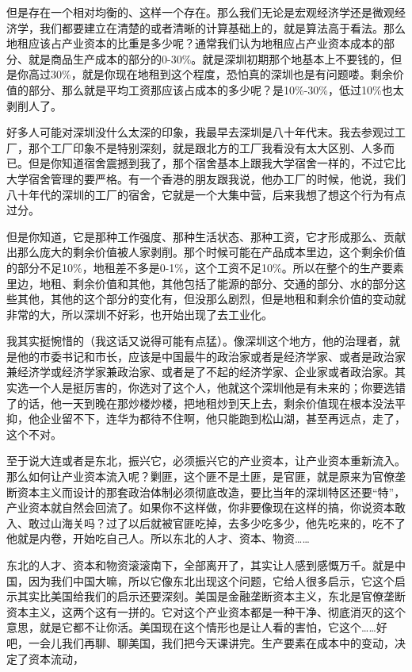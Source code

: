 \documentclass[UTF8, 12pt, a4paper]{ctexrep}
\begin{document}
但是存在一个相对均衡的、这样一个存在。那么我们无论是宏观经济学还是微观经济学，我们都要建立在清楚的或者清晰的计算基础上的，就是算法高于看法。那么地租应该占产业资本的比重是多少呢？通常我们认为地租应占产业资本成本的部分、就是商品生产成本的部分的0-30\%。就是深圳初期那个地基本上不要钱的，但是你高过30\%，就是你现在地租到这个程度，恐怕真的深圳也是有问题喽。剩余价值的部分、那么就是平均工资那应该占成本的多少呢？是10\%-30\%，低过10\%也太剥削人了。

好多人可能对深圳没什么太深的印象，我最早去深圳是八十年代末。我去参观过工厂，那个工厂印象不是特别深刻，就是跟北方的工厂我看没有太大区别、人多而已。但是你知道宿舍震撼到我了，那个宿舍基本上跟我大学宿舍一样的，不过它比大学宿舍管理的要严格。有一个香港的朋友跟我说，他办工厂的时候，他说，我们八十年代的深圳的工厂的宿舍，它就是一个大集中营，后来我想了想这个行为有点过分。

但是你知道，它是那种工作强度、那种生活状态、那种工资，它才形成那么、贡献出那么庞大的剩余价值被人家剥削。那个时候可能在产品成本里边，这个剩余价值的部分不足10\%，地租差不多是0-1\%，这个工资不足10\%。所以在整个的生产要素里边，地租、剩余价值和其他，其他包括了能源的部分、交通的部分、水的部分这些其他，其他的这个部分的变化有，但没那么剧烈，但是地租和剩余价值的变动就非常的大，所以深圳不好彩，也开始出现了去工业化。

我其实挺惋惜的（我这话又说得可能有点猛）。像深圳这个地方，他的治理者，就是他的市委书记和市长，应该是中国最牛的政治家或者是经济学家、或者是政治家兼经济学或经济学家兼政治家、或者是了不起的经济学家、企业家或者政治家。其实选一个人是挺厉害的，你选对了这个人，他就这个深圳他是有未来的；你要选错了的话，他一天到晚在那炒楼炒楼，把地租炒到天上去，剩余价值现在根本没法平抑，他企业留不下，连华为都待不住啊，他只能跑到松山湖，甚至再远点，走了，这个不对。

至于说大连或者是东北，振兴它，必须振兴它的产业资本，让产业资本重新流入。那么如何让产业资本流入呢？剿匪，这个匪不是土匪，是官匪，就是原来为官僚垄断资本主义而设计的那套政治体制必须彻底改造，要比当年的深圳特区还要“特”，产业资本就自然会回流了。如果你不这样做，你非要像现在这样的搞，你说资本敢入、敢过山海关吗？过了以后就被官匪吃掉，去多少吃多少，他先吃来的，吃不了他就是内卷，开始吃自己人。所以东北的人才、资本、物资……

东北的人才、资本和物资滚滚南下，全部离开了，其实让人感到感慨万千。就是中国，因为我们中国大嘛，所以它像东北出现这个问题，它给人很多启示，它这个启示其实比美国给我们的启示还要深刻。美国是金融垄断资本主义，东北是官僚垄断资本主义，这两个这有一拼的。它对这个产业资本都是一种干净、彻底消灭的这个意思，就是它都不让你活。美国现在这个情形也是让人看的害怕，它这个……好吧，一会儿我们再聊、聊美国，我们把今天课讲完。生产要素在成本中的变动，决定了资本流动，
\end{document}
